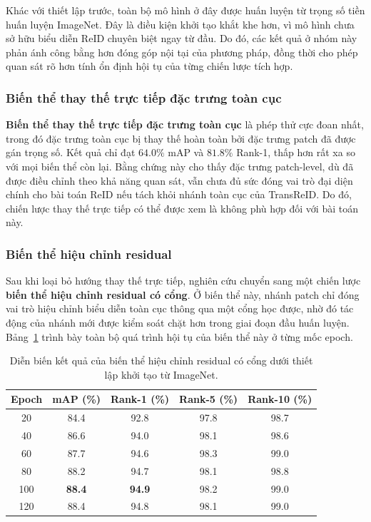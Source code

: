 Khác với thiết lập trước, toàn bộ mô hình ở đây được huấn luyện từ trọng số tiền huấn luyện ImageNet. Đây là điều kiện khởi tạo khắt khe hơn, vì mô hình chưa sở hữu biểu diễn ReID chuyên biệt ngay từ đầu. Do đó, các kết quả ở nhóm này phản ánh công bằng hơn đóng góp nội tại của phương pháp, đồng thời cho phép quan sát rõ hơn tính ổn định hội tụ của từng chiến lược tích hợp.

\subsubsection{Biến thể thay thế trực tiếp đặc trưng toàn cục}

\textbf{Biến thể thay thế trực tiếp đặc trưng toàn cục} là phép thử cực đoan nhất, trong đó đặc trưng toàn cục bị thay thế hoàn toàn bởi đặc trưng patch đã được gán trọng số. Kết quả chỉ đạt $64.0\%$ mAP và $81.8\%$ Rank-1, thấp hơn rất xa so với mọi biến thể còn lại. Bằng chứng này cho thấy đặc trưng patch-level, dù đã được điều chỉnh theo khả năng quan sát, vẫn chưa đủ sức đóng vai trò đại diện chính cho bài toán ReID nếu tách khỏi nhánh toàn cục của TransReID. Do đó, chiến lược thay thế trực tiếp có thể được xem là không phù hợp đối với bài toán này.

\subsubsection{Biến thể hiệu chỉnh residual}

Sau khi loại bỏ hướng thay thế trực tiếp, nghiên cứu chuyển sang một chiến lược \textbf{biến thể hiệu chỉnh residual có cổng}. Ở biến thể này, nhánh patch chỉ đóng vai trò hiệu chỉnh biểu diễn toàn cục thông qua một cổng học được, nhờ đó tác động của nhánh mới được kiểm soát chặt hơn trong giai đoạn đầu huấn luyện. Bảng~\ref{tab:v7_detailed} trình bày toàn bộ quá trình hội tụ của biến thể này ở từng mốc epoch.

\begin{table}[!b]
\centering
\renewcommand{\arraystretch}{1.08}
\begin{tabular}{@{}ccccc@{}}
\toprule
\textbf{Epoch} & \textbf{mAP (\%)} & \textbf{Rank-1 (\%)} & \textbf{Rank-5 (\%)} & \textbf{Rank-10 (\%)} \\
\midrule
20  & 84.4 & 92.8 & 97.8 & 98.7 \\
40  & 86.6 & 94.0 & 98.1 & 98.6 \\
60  & 87.7 & 94.6 & 98.3 & 99.0 \\
80  & 88.2 & 94.7 & 98.1 & 98.8 \\
100 & \textbf{88.4} & \textbf{94.9} & 98.2 & 99.0 \\
120 & 88.4 & 94.8 & 98.1 & 99.0 \\
\bottomrule
\end{tabular}
\caption{Diễn biến kết quả của biến thể hiệu chỉnh residual có cổng dưới thiết lập khởi tạo từ ImageNet.}
\label{tab:v7_detailed}
\end{table}

